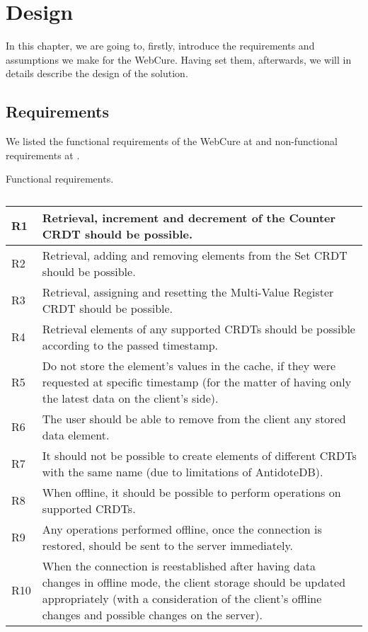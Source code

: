 \chapter{Design}
\label{Design}

In this chapter, we are going to, firstly, introduce the requirements and assumptions we make for the WebCure. Having set them, afterwards, we will in details describe the design of the solution.

\section{Requirements}
\label{4-Requirements}

We listed the functional requirements of the WebCure at  and non-functional requirements at .

\begin{table}[!htbp]
\centering
\caption{Functional requirements.}
\label{table:req1}
\begin{tabular}{|p{1cm}|p{14cm}|}
\hline
R1 & Retrieval, increment and decrement of the Counter CRDT should be possible.                         \\ \hline
R2 & Retrieval, adding and removing elements from the Set CRDT should be possible.                       \\ \hline
R3 & Retrieval, assigning and resetting the Multi-Value Register CRDT should be possible.               \\ \hline
R4 & Retrieval elements of any supported CRDTs should be possible according to the passed timestamp. \\ \hline
R5 & Do not store the element's values in the cache, if they were requested at specific timestamp (for the matter of having only the latest data on the client's side). \\ \hline
R6 & The user should be able to remove from the client any stored data element. \\ \hline
R7 & It should not be possible to create elements of different CRDTs with the same name (due to limitations of AntidoteDB). \\ \hline
R8 & When offline, it should be possible to perform operations on supported CRDTs. \\ \hline
R9 & Any operations performed offline, once the connection is restored, should be sent to the server immediately. \\ \hline
R10 & When the connection is reestablished after having data changes in offline mode, the client storage should be updated appropriately (with a consideration of the client's offline changes and possible changes on the server). \\ \hline
\end{tabular}
\caption*{}
\end{table}


